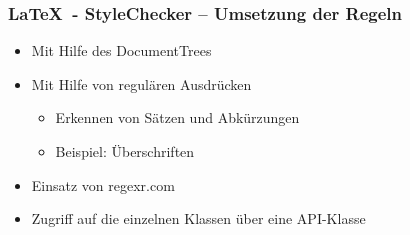 \begin{frame}
\frametitle{\LaTeX~- StyleChecker -- Umsetzung der Regeln}
\begin{block}{\vspace*{-3ex}}
	\begin{itemize}
		\item Mit Hilfe des DocumentTrees
		\item Mit Hilfe von regulären Ausdrücken
		\begin{itemize}
			\item Erkennen von Sätzen und Abkürzungen
			\item Beispiel: Überschriften
		\end{itemize}
		\item Einsatz von regexr.com
		\item Zugriff auf die einzelnen Klassen über eine API-Klasse
	\end{itemize}
\end{block}
\end{frame}
